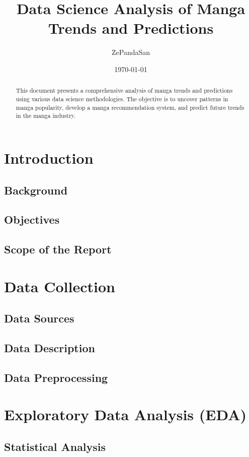 \documentclass{article}
\title{Data Science Analysis of Manga Trends and Predictions}
\author{ZePandaSan}
\date{\today}
\begin{document}
\maketitle

\begin{abstract}
This document presents a comprehensive analysis of manga trends and predictions using various data science methodologies. The objective is to uncover patterns in manga popularity, develop a manga recommendation system, and predict future trends in the manga industry.
\end{abstract}

\tableofcontents

\section{Introduction}
\subsection{Background}
\subsection{Objectives}
\subsection{Scope of the Report}

\section{Data Collection}
\subsection{Data Sources}
\subsection{Data Description}
\subsection{Data Preprocessing}

\section{Exploratory Data Analysis (EDA)}
\subsection{Statistical Analysis}
\end{document}
